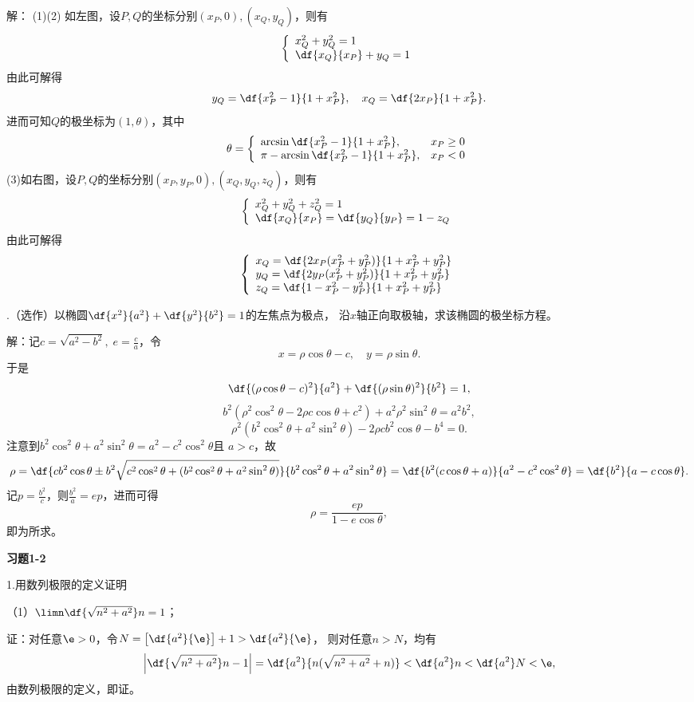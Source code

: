解：
(1)(2) 如左图，设$P,Q$的坐标分别$(x_P,0),(x_Q,y_Q)$，则有
$$
\left\{
\begin{array}{l}
	x^2_Q+y^2_Q=1\\
	\df{x_Q}{x_P}+y_Q=1
\end{array}
\right.
$$
由此可解得
$$y_Q=\df{x^2_P-1}{1+x^2_P},\quad x_Q=\df{2x_P}{1+x^2_P}.$$
进而可知$Q$的极坐标为$(1,\theta)$，其中
$$\theta=
\left\{
\begin{array}{ll}
	\arcsin\df{x^2_P-1}{1+x^2_P},& x_P\geq 0\\
	\pi-\arcsin\df{x^2_P-1}{1+x^2_P}, & x_P<0
\end{array}
\right.
$$
(3)如右图，设$P,Q$的坐标分别$(x_P,y_P,0),(x_Q,y_Q,z_Q)$，则有
$$
\left\{
\begin{array}{l}
	x^2_Q+y^2_Q+z^2_Q=1\\
	\df{x_Q}{x_P}=\df{y_Q}{y_P}=1-z_Q
\end{array}
\right.
$$
由此可解得
$$
\left\{
\begin{array}{l}
	x_Q=\df{2x_P(x^2_P+y^2_P)}{1+x^2_P+y^2_P}\\
	y_Q=\df{2y_P(x^2_P+y^2_P)}{1+x^2_P+y^2_P}\\
	z_Q=\df{1-x^2_P-y^2_P}{1+x^2_P+y^2_P}
\end{array}
\right.
$$
\fin

.（选作）以椭圆$\df{x^2}{a^2}+\df{y^2}{b^2}=1$的左焦点为极点，
沿$x$轴正向取极轴，求该椭圆的极坐标方程。

解：记$c=\sqrt{a^2-b^2},\;e=\frac ca$，令
$$x=\rho\cos\theta-c,\quad y=\rho\sin\theta.$$
于是
$$\df{(\rho\cos\theta-c)^2}{a^2}+\df{(\rho\sin\theta)^2}{b^2}=1,$$
$$b^2(\rho^2\cos^2\theta-2\rho c\cos\theta+c^2)
+a^2\rho^2\sin^2\theta=a^2b^2,$$
$$\rho^2(b^2\cos^2\theta+a^2\sin^2\theta)-2\rho cb^2\cos\theta-b^4=0.$$
注意到$b^2\cos^2\theta+a^2\sin^2\theta=a^2-c^2\cos^2\theta$且
$a>c$，故
$$\rho=\df{cb^2\cos\theta\pm b^2\sqrt{c^2\cos^2\theta
+(b^2\cos^2\theta+a^2\sin^2\theta)}}{b^2\cos^2\theta
+a^2\sin^2\theta}=\df{b^2(c\cos\theta+a)}{a^2-c^2\cos^2\theta}
=\df{b^2}{a-c\cos\theta}.$$
记$p=\frac{b^2}{c}$，则$\frac{b^2}{a}=ep$，进而可得
$$\rho=\frac{ep}{1-e\cos\theta},$$
即为所求。\fin

\begin{center}
	\bf 习题1-2
\end{center}

1.用数列极限的定义证明

（1）$\limn\df{\sqrt{n^2+a^2}}n=1$；

证：对任意$\e>0$，令$N=\left[\df{a^2}{\e}\right]+1>\df{a^2}{\e}$，
则对任意$n>N$，均有
$$\left|\df{\sqrt{n^2+a^2}}n-1\right|
=\df{a^2}{n(\sqrt{n^2+a^2}+n)}<\df{a^2}n<\df{a^2}N<\e,
$$
由数列极限的定义，即证。\fin


